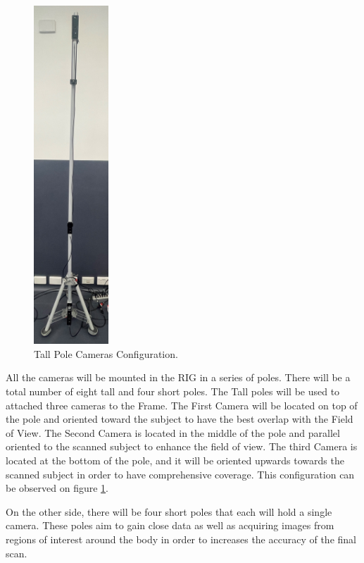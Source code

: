 \documentclass[12pt]{report}
\begin{document}
\begin{figure}
  \begin{center}
    \includegraphics[width=0.25\textwidth]{IMG_5895_cropped.jpg}
  \end{center}
  \caption{Tall Pole Cameras Configuration.}
  \label{fig:poles_camera_tall}
\end{figure}
All the cameras will be mounted in the RIG in a series of poles. There will be a total number of eight tall and four short poles.
The Tall poles will be used to attached three cameras to the Frame. The First Camera will be located on top of the pole and oriented toward the subject to have the best overlap with the Field of View.
The Second Camera is located in the middle of the pole and parallel oriented to the scanned subject to enhance the field of view. 
The third Camera is located at the bottom of the pole, and it will be oriented upwards towards the scanned subject in order to have comprehensive coverage. 
This configuration can be observed on figure \ref{fig:poles_camera_tall}.

On the other side, there will be four short poles that each will hold a single camera. 
These poles aim to gain close data as well as acquiring images from regions of interest around the body in order to increases
the accuracy of the final scan. 
\end{document}
